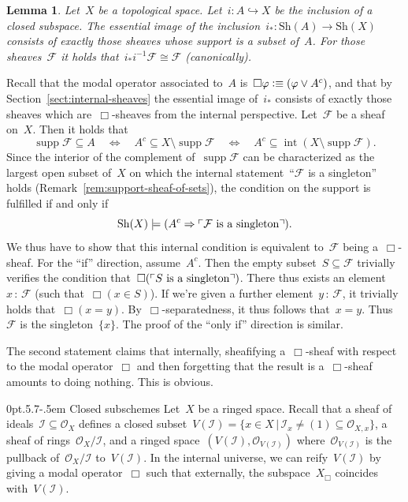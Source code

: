 \documentclass[10pt,reqno,a4paper]{amsbook}
\makeatletter
\theoremstyle{definition}
\theoremstyle{plain}
\newtheorem{lemma}[defn]{Lemma}
\theoremstyle{remark}
\newcommand{\F}{\mathcal{F}}
\renewcommand{\O}{\mathcal{O}}
\newcommand{\I}{\mathcal{I}}
\newcommand{\Sh}{\mathrm{Sh}}
\DeclareMathOperator{\Int}{int}
\DeclareMathOperator{\supp}{supp}
\newcommand{\?}{\,{:}\,}
\renewcommand{\_}{\mathpunct{.}\,}
\newcommand{\speak}[1]{\ulcorner\text{\textnormal{#1}}\urcorner}
\newcommand{\defequiv}{\vcentcolon\equiv}
\renewenvironment{proof}[1][\proofname]{\par
  \pushQED{\qed}%
  \normalfont \topsep6\p@\@plus6\p@\relax
  \trivlist
  \item[\hskip\labelsep
        \itshape
    #1\@addpunct{.}]\ignorespaces
}{%
  \popQED\endtrivlist\@endpefalse
}
\def\subsection{\@startsection{subsection}{2}%
  {0pt}{.5\linespacing\@plus.7\linespacing}{-.5em}%
  {\normalfont\bfseries}}
\makeatother
\begin{document}
\begin{lemma}\label{lemma:essim-closed-immersion}
Let~$X$ be a topological space. Let~$i : A \hookrightarrow X$ be the inclusion
of a closed subspace. The essential image of the
inclusion~$i_* : \Sh(A) \to \Sh(X)$ consists of exactly those sheaves whose support
is a subset of~$A$. For those sheaves~$\F$ it holds that~$i_* i^{-1} \F \cong \F$
(canonically).\end{lemma}
\begin{proof}Recall that the modal operator associated to~$A$ is~$\Box\varphi
\defequiv (\varphi \vee A^c)$, and that by Section~\ref{sect:internal-sheaves} the
essential image of~$i_*$ consists of exactly those sheaves which
are~$\Box$-sheaves from the internal perspective. Let~$\F$ be a sheaf on~$X$.
Then it holds that
\[ \supp\F \subseteq A \quad\Longleftrightarrow\quad
  A^c \subseteq X \setminus \supp\F \quad\Longleftrightarrow\quad
  A^c \subseteq \Int(X \setminus \supp\F). \]
Since the interior of the complement of~$\supp\F$ can be characterized as the
largest open subset of~$X$ on which the internal statement~``$\F$ is a
singleton'' holds (Remark~\ref{rem:support-sheaf-of-sets}), the condition on
the support is fulfilled if and only if
\[ \Sh(X) \models (A^c \Rightarrow \speak{$\F$ is a singleton}). \]
We thus have to show that this internal condition is equivalent to~$\F$ being
a~$\Box$-sheaf. For the ``if'' direction, assume~$A^c$. Then the empty subset~$S
\subseteq \F$ trivially verifies the condition that~$\Box(\speak{$S$ is a
singleton})$. There thus exists an element~$x\?\F$ (such that~$\Box(x \in S)$).
If we're given a further element~$y\?\F$, it trivially holds that~$\Box(x =
y)$. By~$\Box$-separatedness, it thus follows that~$x = y$. Thus~$\F$ is the
singleton~$\{x\}$. The proof of the ``only if'' direction is similar.

The second statement claims that internally, sheafifying a~$\Box$-sheaf with
respect to the modal operator~$\Box$ and then forgetting that the result is
a~$\Box$-sheaf amounts to doing nothing. This is obvious.
\end{proof}

\subsection{Closed subschemes} Let~$X$ be a ringed space. Recall
that a sheaf of ideals~$\I \subseteq \O_X$ defines a closed subset~$V(\I) = \{ x
\in X \,|\, \I_x \neq (1) \subseteq \O_{X,x} \}$, a sheaf of
rings~$\O_X/\I$, and a ringed space~$(V(\I), \O_{V(\I)})$ where~$\O_{V(\I)}$ is
the pullback of~$\O_X/\I$ to~$V(\I)$. In the internal universe, we can
reify~$V(\I)$ by giving a modal operator~$\Box$ such that externally, the
subspace~$X_\Box$ coincides with~$V(\I)$.
\end{document}
